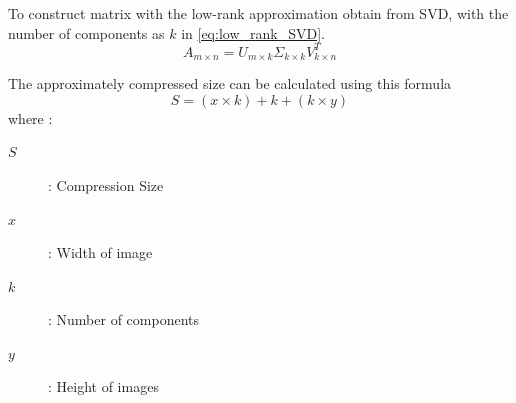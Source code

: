 \documentclass[conference]{IEEEtran}
\begin{document}
To construct matrix with the low-rank approximation obtain from SVD, with the number of components as $k$ in \ref{eq:low_rank_SVD}.
\begin{equation}
    \label{eq:low_rank_SVD}
    A_{m \times n} = U_{m\times k} \Sigma_{k\times k} V_{k\times n}^T 
\end{equation}

The approximately compressed size can be calculated using this formula 
\begin{equation}
    S = (x \times k) + k + (k \times y)
\end{equation}
where : 
\begin{description}
    \item[$S$] : Compression Size
    \item[$x$] : Width of image 
    \item[$k$] : Number of components
    \item[$y$] : Height of images
\end{description}
\end{document}
